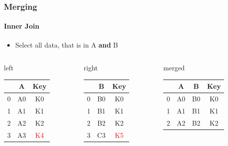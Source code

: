 \documentclass[english]{beamer}
\def\firstcircle{(0,0) circle (2cm)}
\def\secondcircle{(0:3cm) circle (2cm)}
\begin{document}
\begin{frame}
\frametitle{Merging}
\framesubtitle{Inner Join}

\begin{itemize}
\item Select all data, that is in A \textbf{and} B
\end{itemize}

\begin{center}
\end{center}

{\footnotesize
\begin{columns}
\begin{column}{0.3\textwidth}
left \\
\begin{tabular}{c|cc} \toprule
   & A  &  Key \\ \midrule
0 & A0 &  K0 \\
1 & A1 &  K1 \\ 
2 & A2 &  K2 \\
3 & A3 &  \textcolor{red}{K4} \\ \bottomrule
\end{tabular}
\end{column}
\begin{column}{0.3\textwidth}
right \\
\begin{tabular}{c|cc} \toprule
   &  B   & Key \\ \midrule
0 &  B0 & K0 \\
1 &  B1 & K1 \\ 
2 &  B2 & K2 \\
3 &  C3 & \textcolor{red}{K5} \\ \bottomrule
\end{tabular}\end{column}
\begin{column}{0.3\textwidth}
merged \\
\begin{tabular}{c|ccc} \toprule
   & A  & B   & Key \\ \midrule
0 & A0 & B0 & K0 \\
1 & A1 & B1 & K1 \\ 
2 & A2 & B2 & K2 \\ \bottomrule
\end{tabular} \\
\vspace*{1.5em}
\end{column}
\end{columns}}


\end{frame}
\end{document}
